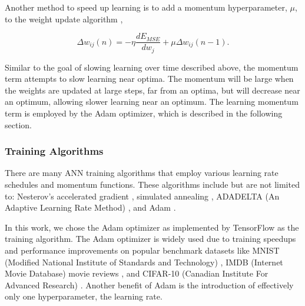 Another method to speed up learning is to add a momentum hyperparameter, $\mu$, to the weight update algorithm \cite{Yu1997}, 

\begin{equation} \label{eq:update_momentum}
\Delta w_{ij}(n) = - \eta \frac{dE_{MSE}}{dw_j} +\mu \Delta w_{ij}(n-1).
\end{equation}

Similar to the goal of slowing learning over time described above, the momentum term attempts to slow learning near optima. The momentum will be large when the weights are updated at large steps, far from an optima, but will decrease near an optimum, allowing slower learning near an optimum. The learning momentum term is employed by the Adam optimizer, which is described in the following section.

\subsubsection{Training Algorithms} \label{section_training_algs}

There are many ANN training algorithms that employ various learning rate schedules and momentum functions. These algorithms include but are not limited to: Nesterov's accelerated gradient \cite{nesterov1983}, simulated annealing \cite{Kirkpatrick1983}, ADADELTA (An Adaptive Learning Rate Method) \cite{ADADELTA}, and Adam \cite{Kingma2015}. 

In this work, we chose the Adam optimizer as implemented by TensorFlow \cite{tensorflow2015-whitepaper} as the training algorithm. The Adam optimizer is widely used due to training speedups and performance improvements on popular benchmark datasets like MNIST (Modified National Institute of Standards and Technology) \cite{lecun98}, IMDB (Internet Movie Database) movie reviews \cite{Maas2011}, and CIFAR-10 (Canadian Institute For Advanced Research) \cite{Krizhevsky2009}. Another benefit of Adam is the introduction of effectively only one hyperparameter, the learning rate.

